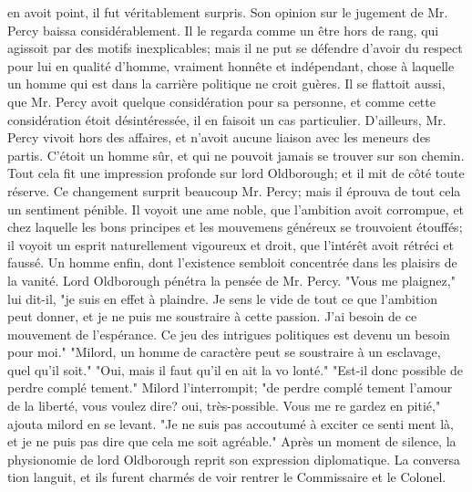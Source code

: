 en avoit point, il fut véritablement surpris. Son opinion sur le jugement de Mr. Percy baissa considérablement. Il le regarda comme un être hors de rang, qui agissoit par des motifs inexplicables; mais il ne put se défendre d'avoir du respect pour lui en qualité d'homme, vraiment honnête et indépendant,\setcounter{page}{517} chose à laquelle un homme qui est dans la carrière politique ne croit guères. Il se flattoit aussi, que Mr. Percy avoit quelque considération pour sa personne, et comme cette considération étoit désintéressée, il en faisoit un cas particulier. D'ailleurs, Mr. Percy vivoit hors des affaires, et n'avoit aucune liaison avec les meneurs des partis. C'étoit un homme sûr, et qui ne pouvoit jamais se trouver sur son chemin. Tout cela fit une impression profonde sur lord Oldborough; et il mit de côté toute réserve. Ce changement surprit beaucoup Mr. Percy; mais il éprouva de tout cela un sentiment pénible. Il voyoit une ame noble, que l'ambition avoit corrompue, et chez laquelle les bons principes et les mouvemens généreux se trouvoient étouffés; il voyoit un esprit naturellement vigoureux et droit, que l'intérêt avoit rétréci et faussé. Un homme enfin, dont l'existence sembloit concentrée dans les plaisirs de la vanité. Lord Oldborough pénétra la pensée de Mr. Percy. "Vous me plaignez," lui dit-il, "je suis en effet à plaindre. Je sens le vide de tout ce que l'ambition peut donner, et je ne puis me soustraire à cette passion. J'ai besoin de ce mouvement de l'espérance. Ce jeu des intrigues politiques est devenu un besoin pour moi."\setcounter{page}{518} "Milord, un homme de caractère peut
se soustraire à un esclavage, quel qu'il soit."
"Oui, mais il faut qu'il en ait la vo
lonté."
"Est-il donc possible de perdre complé
tement."
Milord l'interrompit; "de perdre complé
tement l'amour de la liberté, vous voulez
dire? oui, très-possible. Vous me re
gardez en pitié," ajouta milord en se levant.
"Je ne suis pas accoutumé à exciter ce senti
ment là, et je ne puis pas dire que cela me soit
agréable."
Après un moment de silence,
la physionomie de lord Oldborough reprit
son expression diplomatique. La conversa
tion languit, et ils furent charmés de voir
rentrer le Commissaire et le Colonel.

